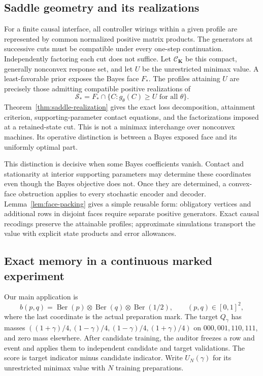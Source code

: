\documentclass[11pt]{amsart}
\theoremstyle{definition}\newtheorem{definition}[theorem]{Definition}
\theoremstyle{remark}\newtheorem{remark}[theorem]{Remark}
\newcommand{\Ber}{\operatorname{Ber}}
\newcommand{\1}{\mathbf 1}
\begin{document}
\subsection{Saddle geometry and its realizations}
For a finite causal interface, all controller wirings within a given
profile are represented by common normalized positive matrix products.
The generators at successive cuts must be compatible under every
one-step continuation. Independently factoring each cut does not suffice.
Let $\mathcal C_{\mathbf K}$ be this compact, generally nonconvex
response set, and let $U$ be the unrestricted minimax value. A
least-favorable prior exposes the Bayes face $F_*$. The profiles attaining
$U$ are precisely those admitting compatible positive realizations of
\[
 \mathcal S_*=F_*\cap\{C:g_\theta(C)\ge U\text{ for all }\theta\}.
\]
Theorem~\ref{thm:saddle-realization} gives the exact loss decomposition,
attainment criterion, supporting-parameter contact equations, and the
factorizations imposed at a retained-state cut. This is not a minimax
interchange over nonconvex machines. Its operative distinction is between
a Bayes exposed face and its uniformly optimal part.

This distinction is decisive when some Bayes coefficients vanish.
Contact and stationarity at interior supporting parameters may determine
these coordinates even though the Bayes objective does not. Once they
are determined, a convex-face obstruction applies to every stochastic
encoder and decoder. Lemma~\ref{lem:face-packing} gives a simple reusable
form: obligatory vertices and additional rows in disjoint faces require
separate positive generators. Exact causal recodings preserve the
attainable profiles; approximate simulations transport the value with
explicit state products and error allowances.

\subsection{Exact memory in a continuous marked experiment}
Our main application is
\[
 b(p,q)=\Ber(p)\otimes\Ber(q)\otimes\Ber(1/2),\qquad(p,q)\in[0,1]^2,
\]
where the last coordinate is the actual preparation mark. The target
$Q_\gamma$ has masses
$((1+\gamma)/4,(1-\gamma)/4,(1-\gamma)/4,(1+\gamma)/4)$ on
$000,001,110,111$, and zero mass elsewhere. After candidate training,
the auditor freezes a row and event and applies them to independent
candidate and target validations. The score is target indicator minus
candidate indicator. Write $U_N(\gamma)$ for its unrestricted minimax
value with $N$ training preparations.
\end{document}
